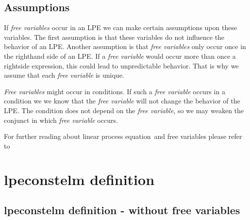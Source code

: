 \index{}\documentclass[a4paper,10pt]{article}
\theoremstyle{plain}
\theoremstyle{definition}
\newcommand{\lpe}{linear process equation}
\newcommand{\ti}{\textit}
\begin{document}
\subsection{Assumptions}
If \ti{free variables} occur in an LPE we can make certain assumptions upon these variables. The first assumption is that these variables do not influence the behavior of an LPE. Another assumption is that \ti{free variables} only occur once in the righthand side of an LPE. If a \ti{free variable} would occur more than once a rightside expression, this could lead to unpredictable behavior. That is why we assume that each \ti{free variable} is unique.

\ti{Free variables} might occur in conditions. If such a \ti{free variable} occurs in a condition we
we know that the \ti{free variable} will not change the behavior of the LPE. The condition does not depend on the \ti{free variable}, so we may weaken the conjunct in which \ti{free variable} occurs.

 
For further reading about \lpe\ and free variables please refer to \cite{LPEfreevar} 

\section{lpeconstelm definition}
\subsection{lpeconstelm definition - without free variables}\label{subsec:lpedef}
\end{document}
